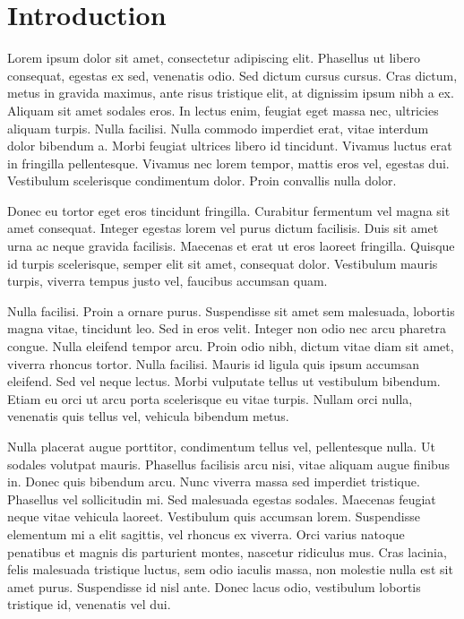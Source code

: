 \chapter{Introduction}

Lorem ipsum dolor sit amet, consectetur adipiscing elit. Phasellus ut libero consequat, egestas ex sed, venenatis odio. Sed dictum cursus cursus. Cras dictum, metus in gravida maximus, ante risus tristique elit, at dignissim ipsum nibh a ex. Aliquam sit amet sodales eros. In lectus enim, feugiat eget massa nec, ultricies aliquam turpis. Nulla facilisi. Nulla commodo imperdiet erat, vitae interdum dolor bibendum a. Morbi feugiat ultrices libero id tincidunt. Vivamus luctus erat in fringilla pellentesque. Vivamus nec lorem tempor, mattis eros vel, egestas dui. Vestibulum scelerisque condimentum dolor. Proin convallis nulla dolor.

Donec eu tortor eget eros tincidunt fringilla. Curabitur fermentum vel magna sit amet consequat. Integer egestas lorem vel purus dictum facilisis. Duis sit amet urna ac neque gravida facilisis. Maecenas et erat ut eros laoreet fringilla. Quisque id turpis scelerisque, semper elit sit amet, consequat dolor. Vestibulum mauris turpis, viverra tempus justo vel, faucibus accumsan quam.

Nulla facilisi. Proin a ornare purus. Suspendisse sit amet sem malesuada, lobortis magna vitae, tincidunt leo. Sed in eros velit. Integer non odio nec arcu pharetra congue. Nulla eleifend tempor arcu. Proin odio nibh, dictum vitae diam sit amet, viverra rhoncus tortor. Nulla facilisi. Mauris id ligula quis ipsum accumsan eleifend. Sed vel neque lectus. Morbi vulputate tellus ut vestibulum bibendum. Etiam eu orci ut arcu porta scelerisque eu vitae turpis. Nullam orci nulla, venenatis quis tellus vel, vehicula bibendum metus.

Nulla placerat augue porttitor, condimentum tellus vel, pellentesque nulla. Ut sodales volutpat mauris. Phasellus facilisis arcu nisi, vitae aliquam augue finibus in. Donec quis bibendum arcu. Nunc viverra massa sed imperdiet tristique. Phasellus vel sollicitudin mi. Sed malesuada egestas sodales. Maecenas feugiat neque vitae vehicula laoreet. Vestibulum quis accumsan lorem. Suspendisse elementum mi a elit sagittis, vel rhoncus ex viverra. Orci varius natoque penatibus et magnis dis parturient montes, nascetur ridiculus mus. Cras lacinia, felis malesuada tristique luctus, sem odio iaculis massa, non molestie nulla est sit amet purus. Suspendisse id nisl ante. Donec lacus odio, vestibulum lobortis tristique id, venenatis vel dui.

